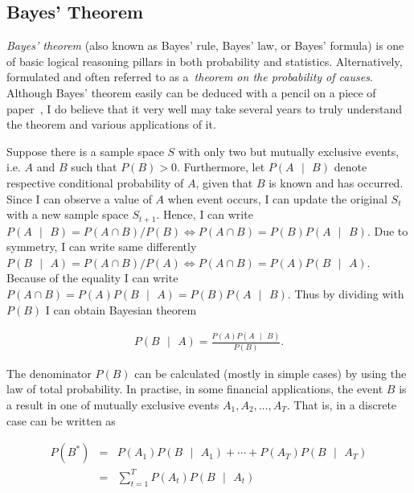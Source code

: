 \documentclass[a4paper,11pt,english]{article}
\begin{document}
		\subsection{Bayes' Theorem}						

		\textit{Bayes' theorem} (also known as Bayes' rule, Bayes' law, or Bayes' formula) is one of basic logical reasoning pillars in both probability 
		and statistics. Alternatively, formulated and often referred to as a~\textit{theorem on the probability of causes}. Although Bayes' theorem easily 
		can be deduced with a pencil on a piece of paper~\citep[pp.~7-17]{schaum}, I do believe that it very well may take several years to truly 
		understand the theorem and various applications of it. 
		
		Suppose there is a sample space $S$ with only two but mutually exclusive events, i.e. $A$ and $B$ such that $P(B) > 0$. Furthermore, let 
		$P(A\text{ }|\text{ }B)$ denote respective conditional probability of $A$, given that $B$ is known and has occurred. Since I can observe a value 
		of $A$ when event occurs, I can update the original $S_t$ with a new sample space $S_{t+1}$. Hence, I can write 
		$P(A\text{ }|\text{ }B) = P(A \cap B)/P(B) \Leftrightarrow P(A \cap B) = P(B) P(A\text{ }|\text{ }B)$. Due to symmetry, I can write same 
		differently $P(B\text{ }|\text{ }A) = P(A \cap B)/P(A) \Leftrightarrow P(A \cap B) = P(A) P(B\text{ }|\text{ }A)$. Because of the equality I 
		can write $P(A \cap B) = P(A) P(B\text{ }|\text{ }A) = P(B) P(A\text{ }|\text{ }B)$. Thus by dividing with $P(B)$ I can obtain Bayesian theorem  

		\begin{eqnarray*}
			P(B \text{ }|\text{ } A) = \frac{P(A) P(A\text{ }|\text{ }B)}{P(B)}.
		\end{eqnarray*}
		
		\noindent The denominator $P(B)$ can be calculated (mostly in simple cases) by using the law of total probability. In practise, in some financial 
		applications, the event $B$ is a result in one of mutually exclusive events $A_1, A_2,\ldots, A_T$. That is, in a discrete case can be written as

		\begin{eqnarray*}
			P(B^\ast) &=& P(A_1)P(B \text{ } | \text{ }A_1) + \cdots + P(A_T)P(B\text{ } | \text{ }A_T) \\
	     			  &=& \sum_{t=1}^T{P(A_t)P(B\text{ }|\text{ }A_t)}  	
		\end{eqnarray*}
		
\end{document}
